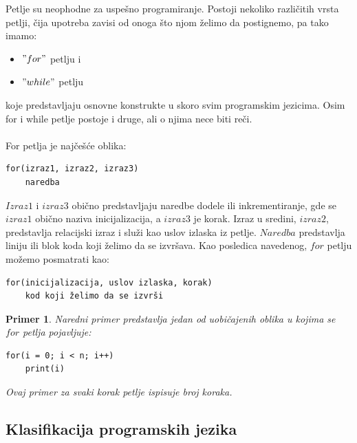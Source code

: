 \documentclass[a4paper]{article}
\newtheorem{primer}{Primer}[section]
\begin{document}
Petlje su neophodne za uspešno programiranje. 
 Postoji nekoliko različitih vrsta petlji,  čija upotreba zavisi od onoga što njom želimo da postignemo, pa tako imamo:
\begin{itemize}
\item $"for"$ petlju i
\item $"while"$ petlju 
\end{itemize}
koje predstavljaju osnovne konstrukte u skoro svim programskim jezicima. Osim for i while petlje postoje i druge, ali o njima nece biti reči.\\\\
For petlja je najčešće oblika:
\begin{verbatim}
for(izraz1, izraz2, izraz3)
    naredba
\end{verbatim}
$Izraz1$ i $izraz3$ obično predstavljaju naredbe dodele ili inkrementiranje, gde se $izraz1$ obično naziva inicijalizacija, a $izraz3$ je korak. Izraz u sredini, $izraz2$, predstavlja relacijski izraz i služi kao uslov izlaska iz petlje. $Naredba$ predstavlja liniju ili blok koda koji želimo da se izvršava.
Kao posledica navedenog, $for$ petlju možemo posmatrati kao:
\begin{verbatim}
for(inicijalizacija, uslov izlaska, korak)
    kod koji želimo da se izvrši
\end{verbatim}
\begin{primer}
Naredni primer predstavlja jedan od uobičajenih oblika u kojima se $for$ petlja pojavljuje:
\begin{verbatim}
for(i = 0; i < n; i++)
    print(i)
\end{verbatim}
Ovaj primer za svaki korak petlje ispisuje broj koraka. 
\end{primer}


\subsection{Klasifikacija programskih jezika}
\end{document}
